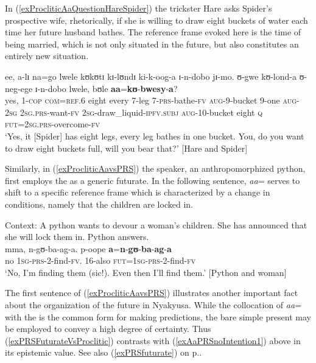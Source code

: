 In (\ref{exProcliticAaQuestionHareSpider}) the trickster Hare asks Spider's prospective wife, rhetorically, if she is willing to draw eight buckets of water each time her future husband bathes. The reference frame evoked here is the time of being married, which is not only situated in the future, but also constitutes an entirely new situation.

\begin{exe}
\ex \label{exProcliticAaQuestionHareSpider}\gll ee, a-lɪ na=go lwele kʊkʊtɪ kɪ-lʊndɪ ki-k-oog-a ɪ-n-dobo jɪ-mo. ʊ-gwe kʊ-lond-a ʊ-neg-ege ɪ-n-dobo lwele, bʊle \textbf{aa}=\textbf{kʊ}-\textbf{bwesy}-\textbf{a}?\\
yes, 1-\textsc{cop} \textsc{com}=\textsc{ref.6} eight every 7-leg 7-\textsc{prs}-bathe-\textsc{fv} \textsc{aug}-9-bucket 9-one \textsc{aug}-\textsc{2sg} \textsc{2sg.prs}-want-\textsc{fv} \textsc{2sg}-draw\_liquid-\textsc{ipfv.subj} \textsc{aug}-10-bucket eight \textsc{q} \textsc{fut}=\textsc{2sg.prs}-overcome-\textsc{fv}\\
\glt `Yes, it [Spider] has eight legs, every leg bathes in one bucket. You, do you want to draw eight buckets full, will you bear that?' [Hare and Spider]
\end{exe}

Similarly, in (\ref{exProcliticAavsPRS}) the speaker, an anthropomorphized python, first employs the  as a generic futurate. In the following sentence, \textit{aa}= serves to shift to a specific reference frame which is characterized by a change in conditions, namely that the children are locked in.

\begin{exe}
\ex \label{exProcliticAavsPRS}
Context: A python wants to devour a woman's children. She has announced that she will lock them in. Python answers.\\
\gll mma, n-gʊ-ba-ag-a. p-oope \textbf{a}=\textbf{n}-\textbf{gʊ}-\textbf{ba}-\textbf{ag}-\textbf{a}\\
no \textsc{1sg}-\textsc{prs}-2-find-\textsc{fv}. 16-also \textsc{fut}=\textsc{1sg}-\textsc{prs}-2-find-\textsc{fv}\\
\glt \lq No, I'm finding them (sic!). Even then I'll find them.' [Python and woman]
\end{exe}

The first sentence of (\ref{exProcliticAavsPRS}) illustrates another important fact about the organization of the future in Nyakyusa. While the collocation of \textit{aa}= with the  is the common form for making predictions, the bare simple present may be employed to convey a high degree of certainty. Thus (\ref{exPRSFuturateVsProclitic}) contrasts with (\ref{exAaPRSnoIntention1}) above in its epistemic value. See also (\ref{exPRSfuturate}) on p.\nobreakspace\pageref{exPRSfuturate}.

